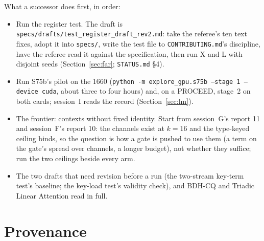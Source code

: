\documentclass[11pt]{article}
\begin{document}
What a successor does first, in order:
\begin{itemize}
\item Run the register test. The draft is \texttt{specs/drafts/test\_register\_draft\_rev2.md}: take the referee's ten text fixes, adopt it into \texttt{specs/}, write the test file to \texttt{CONTRIBUTING.md}'s discipline, have the referee read it against the specification, then run X and L with disjoint seeds (Section~\ref{sec:far}; \texttt{STATUS.md} \S4).
\item Run S75b's pilot on the 1660 (\texttt{python -m explore\_gpu.s75b --stage 1 --device cuda}, about three to four hours) and, on a PROCEED, stage~2 on both cards; session~I reads the record (Section~\ref{sec:lm}).
\item The frontier: contexts without fixed identity. Start from session~G's report 11 and session~F's report 10: the channels exist at $k = 16$ and the type-keyed ceiling binds, so the question is how a gate is pushed to use them (a term on the gate's spread over channels, a longer budget), not whether they suffice; run the two ceilings beside every arm.
\item The two drafts that need revision before a run (the two-stream key-term test's baseline; the key-load test's validity check), and BDH-CQ and Triadic Linear Attention read in full.
\end{itemize}


\appendix
\section{Provenance}
\label{app:prov}
\end{document}

